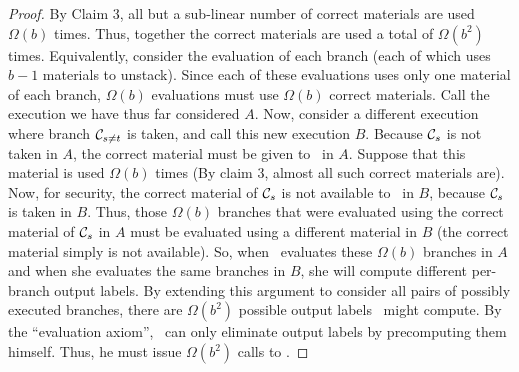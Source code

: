 \begin{proof}
By Claim 3, all but a sub-linear number of correct
materials are used $\Omega(b)$ times. Thus, together the correct materials are used a
total of $\Omega(b^2)$ times. Equivalently, consider the evaluation of each
branch (each of which uses $b-1$ materials to unstack). Since each of these
evaluations uses only one material of each branch, $\Omega(b)$ evaluations
must use $\Omega(b)$ correct materials.  Call the execution we have thus far
considered $A$.
Now, consider a different execution where branch
$\mathcal C_{s\neq t}$  is taken, and call this new execution $B$. Because
$\mathcal C_s$ is
not taken in $A$, the correct material must be given to \Eval\ in $A$. Suppose
that this material is used $\Omega(b)$ times (By claim 3, almost all such
correct materials are). Now, for security, the correct material of $\mathcal C_s$ is
not available to \Eval\ in $B$, because $\mathcal C_s$ is taken in $B$. Thus, those
$\Omega(b)$ branches that were evaluated using the correct material of
$\mathcal C_s$
in $A$
must be evaluated using a different material in $B$ (the correct
material
simply is not available). So, when \Eval\ evaluates these $\Omega(b)$ branches
in $A$ and when she evaluates the same branches in $B$, she will compute
different per-branch output labels. By extending this argument to
consider all pairs of possibly executed branches, there are $\Omega(b^2)$
possible output labels \Eval\ might compute. By the “evaluation axiom”,
\Gen\ can only eliminate output labels by precomputing them himself.
Thus, he must issue $\Omega(b^2)$ calls to \Ev.
\end{proof}


